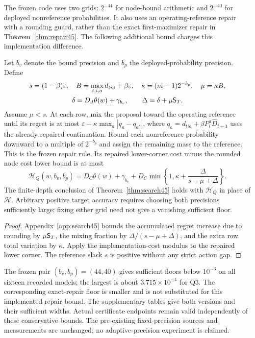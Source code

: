 The frozen code uses two grids: $2^{-44}$ for node-bound arithmetic and $2^{-40}$ for deployed nonreference probabilities. It also uses an operating-reference repair with a rounding guard, rather than the exact first-maximizer repair in Theorem~\ref{thm:repair45}. The following additional bound charges this implementation difference.

\begin{corollary}\label{cor:quantized45}
Let $b_v$ denote the bound precision and $b_p$ the deployed-probability precision. Define
\begin{equation}\label{eq:quantities45}
 \begin{gathered}
 s=(1-\beta)\varepsilon,\quad B=\max_{t,i,a}d_{tia}+\beta\varepsilon,
 \quad \kappa=(m-1)2^{-b_p},\quad \mu=\kappa B,\\
 \delta=D_J\theta(w)+\gamma_{b_v},\qquad
 \Delta=\delta+\mu\mathsf S_{T}.
 \end{gathered}
\end{equation}
Assume $\mu<s$. At each row, mix the proposal toward the operating reference until its regret is at most $\varepsilon-\kappa\max_a|q_a-q_{a^*}|$, where $q_a=d_{tia}+\beta P_i^a\widehat D_{t+1}$ uses the already repaired continuation. Round each nonreference probability downward to a multiple of $2^{-b_p}$ and assign the remaining mass to the reference. This is the frozen repair rule. Its repaired lower-corner cost minus the rounded node cost lower bound is at most
\begin{equation}\label{eq:HQ45}
 \mathcal H_Q(w,b_v,b_p)=D_C\theta(w)+\gamma_{b_v}
       +D_C\min\left\{1,\kappa+\frac{\Delta}{s-\mu+\Delta}\right\}.
\end{equation}
The finite-depth conclusion of Theorem~\ref{thm:search45} holds with $\mathcal H_Q$ in place of $\mathcal H$. Arbitrary positive target accuracy requires choosing both precisions sufficiently large; fixing either grid need not give a vanishing sufficient floor.
\end{corollary}
\begin{proof}
Appendix~\ref{app:search45} bounds the accumulated regret increase due to rounding by $\mu\mathsf S_{T}$, the mixing fraction by $\Delta/(s-\mu+\Delta)$, and the extra row total variation by $\kappa$. Apply the implementation-cost modulus to the repaired lower corner. The reference slack $s$ is positive without any strict action gap.
\end{proof}
The frozen pair $(b_v,b_p)=(44,40)$ gives sufficient floors below $10^{-3}$ on all sixteen recorded models; the largest is about $3.715\times10^{-4}$ for Q3. The corresponding exact-repair floor is smaller and is not substituted for this implemented-repair bound. The supplementary tables give both versions and their sufficient widths. Actual certificate endpoints remain valid independently of these conservative bounds. The pre-existing fixed-precision sources and measurements are unchanged; no adaptive-precision experiment is claimed.

